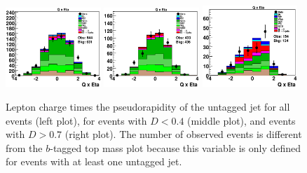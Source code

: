 \begin{figure}[!h!tbp]
\includegraphics[width=0.32\textwidth]
{figures/topovars/QTimesEta_0.eps}
\includegraphics[width=0.32\textwidth]
{figures/topovars/QTimesEta_-0.4.eps}
\includegraphics[width=0.32\textwidth]
{figures/topovars/QTimesEta_0.7.eps}
\vspace{-0.1in}
\caption[qeta]{Lepton charge times the pseudorapidity of the untagged
jet for all events (left plot), for events with $D < 0.4$ (middle
plot), and events with $D > 0.7$ (right plot). The number of observed
events is different from the $b$-tagged top mass plot because this
variable is only defined for events with at least one untagged jet.}
\label{q-eta}
\end{figure}
